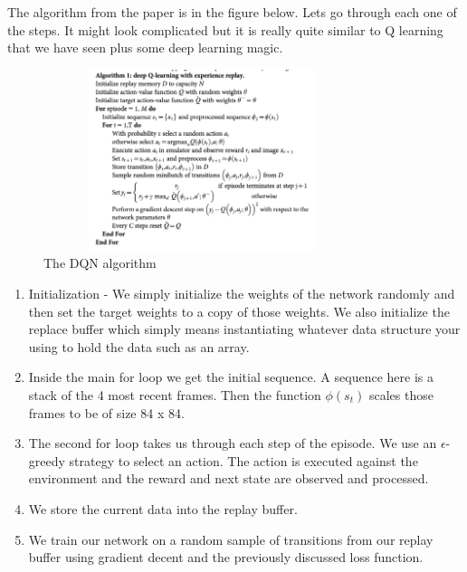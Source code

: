 The algorithm from the paper is in the figure below. Lets go through each one of the steps. It might look complicated but it is really quite similar to Q learning that we have seen plus some deep learning magic. 

\begin{figure}[H]
    \centering
    \includegraphics[width=350px,height=200px]{images/DQN_algo.png}
    \caption{The DQN algorithm}
    \label{fig:my_label}
\end{figure}

\begin{enumerate}
    \item Initialization - We simply initialize the weights of the network randomly and then set the target weights to a copy of those weights. We also initialize the replace buffer which simply means instantiating whatever data structure your using to hold the data such as an array.  
    \item Inside the main for loop we get the initial sequence. A sequence here is a stack of the 4 most recent frames. Then the function $\phi(s_{t})$ scales those frames to be of size 84 x 84. 
    \item The second for loop takes us through each step of the episode. We use an $\epsilon$-greedy strategy to select an action. The action is executed against the environment and the reward and next state are observed and processed. 
    \item We store the current data into the replay buffer. 
    \item We train our network on a random sample of transitions from our replay buffer using gradient decent and the previously discussed loss function. 
\end{enumerate}

